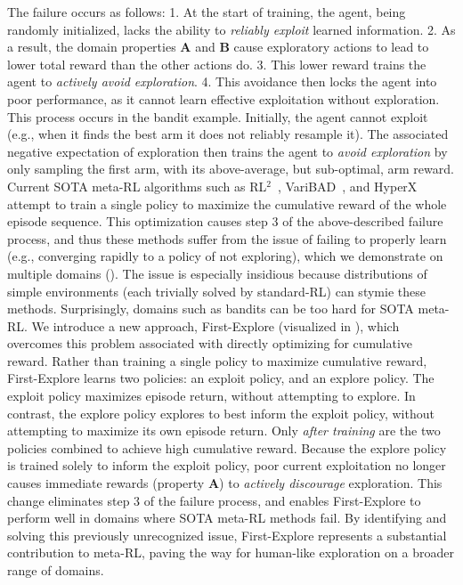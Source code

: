 \documentclass{article}
\begin{document}
The failure occurs as follows:
1. At the start of training, the agent, being randomly initialized, lacks the ability to \emph{reliably exploit} learned information.
2. As a result, the domain properties \textbf{A} and \textbf{B} cause exploratory actions to lead to lower total reward than the other actions do.
3. This lower reward trains the agent to \emph{actively avoid exploration}.
4. This avoidance then locks the agent into poor performance, as it cannot learn effective exploitation without exploration. This process occurs in the bandit example. Initially, the agent cannot exploit (e.g., when it finds the best arm it does not reliably resample it). The associated negative expectation of exploration then trains the agent to \emph{avoid exploration} by only sampling the first arm, with its above-average, but sub-optimal, arm reward.
Current SOTA meta-RL algorithms such as RL\(^2\)~\citep{rl2, rl2alt}, VariBAD~\citep{VariBAD}, and HyperX~\citep{hyperx} attempt to train a single policy to maximize the cumulative reward of the whole episode sequence. This optimization causes step 3 of the above-described failure process, and thus these methods suffer from the issue of failing to properly learn (e.g., converging rapidly to a policy of not exploring), which we demonstrate on multiple domains (). The issue is especially insidious because distributions of simple environments (each trivially solved by standard-RL) can stymie these methods. Surprisingly, domains such as bandits can be too hard for SOTA meta-RL.
We introduce a new approach, First-Explore (visualized in ), which overcomes this problem associated with directly optimizing for cumulative reward.
Rather than training a single policy to maximize cumulative reward, First-Explore learns two policies: an exploit policy, and an explore policy. The exploit policy maximizes episode return, without attempting to explore. In contrast, the explore policy explores to best inform the exploit policy, without attempting to maximize its own episode return. Only \emph{after training} are the two policies combined to achieve high cumulative reward.
Because the explore policy is trained solely to inform the exploit policy, poor current exploitation no longer causes immediate rewards (property \textbf{A}) to \emph{actively discourage} exploration. This change eliminates step 3 of the failure process, and enables First-Explore to perform well in domains where SOTA meta-RL methods fail. By identifying and solving this previously unrecognized issue, First-Explore represents a substantial contribution to meta-RL, paving the way for human-like exploration on a broader range of domains.
\end{document}
